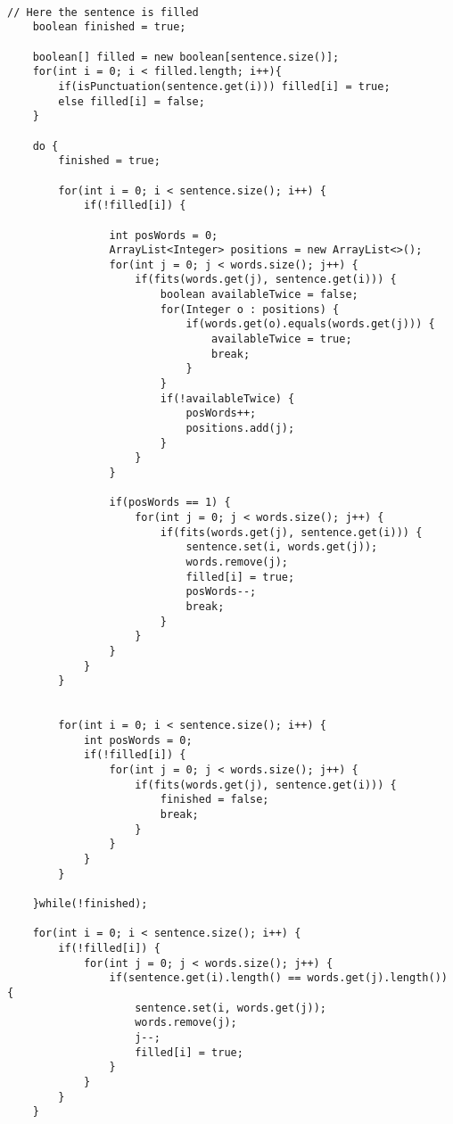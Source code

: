 \documentclass[a4paper, 12pt]{scrartcl}
\begin{document}
\begin{lstlisting}[H]

// Here the sentence is filled
    boolean finished = true;
	        
    boolean[] filled = new boolean[sentence.size()];
    for(int i = 0; i < filled.length; i++){
        if(isPunctuation(sentence.get(i))) filled[i] = true;
        else filled[i] = false;
    }
    
    do {
        finished = true;
        
        for(int i = 0; i < sentence.size(); i++) {
            if(!filled[i]) {
                
                int posWords = 0;
                ArrayList<Integer> positions = new ArrayList<>();
                for(int j = 0; j < words.size(); j++) {
                    if(fits(words.get(j), sentence.get(i))) {
                        boolean availableTwice = false;
                        for(Integer o : positions) {
                            if(words.get(o).equals(words.get(j))) {
                                availableTwice = true;
                                break;
                            }
                        }
                        if(!availableTwice) {
                            posWords++;
                            positions.add(j);
                        }
                    }
                }
                
                if(posWords == 1) {
                    for(int j = 0; j < words.size(); j++) {
                        if(fits(words.get(j), sentence.get(i))) {
                            sentence.set(i, words.get(j));
                            words.remove(j);
                            filled[i] = true;
                            posWords--;
                            break;
                        }
                    }
                }
            }
        }
        
        
        for(int i = 0; i < sentence.size(); i++) {
            int posWords = 0;
            if(!filled[i]) {
                for(int j = 0; j < words.size(); j++) {
                    if(fits(words.get(j), sentence.get(i))) {
                        finished = false;
                        break;
                    }
                }
            }
        }
        
    }while(!finished);
    
    for(int i = 0; i < sentence.size(); i++) {
        if(!filled[i]) {
            for(int j = 0; j < words.size(); j++) {
                if(sentence.get(i).length() == words.get(j).length()) {
                    sentence.set(i, words.get(j));
                    words.remove(j);
                    j--;
                    filled[i] = true;
                }
            }
        }
    }


\end{lstlisting}
\end{document}
